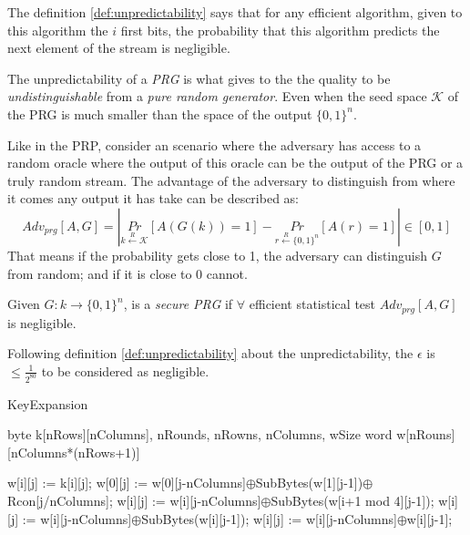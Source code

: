 \documentclass[10pt,a4paper,twoside]{llncs}
\begin{document}
The definition \ref{def:unpredictability} says that for any efficient algorithm, given to this algorithm the $i$ first bits, the probability that this algorithm predicts the next element of the stream is negligible.

The unpredictability of a \emph{PRG} is what gives to the the quality to be \emph{undistinguishable} from a \emph{pure random generator}. Even when the seed space $\mathcal{K}$ of the PRG is much smaller than the space of the output $\{0,1\}^n$.

Like in the PRP, consider an scenario where the adversary has access to a random oracle where the output of this oracle can be the output of the PRG or a truly random stream. The advantage of the adversary to distinguish from where it comes any output it has take can be described as:
\begin{equation}\label{eq:prgAdv}
 {Adv}_{prg}[A,G] = \left|
                     \underset{k\overset{R}{\leftarrow}\mathcal{K}}{Pr}\left[A(G(k))=1\right]-
                     \underset{r\overset{R}{\leftarrow}\{0,1\}^n}{Pr}\left[A(r)=1\right]
                    \right|\in [0,1]
\end{equation}
That means if the probability gets close to 1, the adversary can distinguish $G$ from random; and if it is close to 0 cannot.

\begin{definition}
 Given $G: k \rightarrow \{0,1\}^n$, is a \emph{secure PRG} if $\forall$ efficient statistical test ${Adv}_{prg}[A,G]$ is negligible.
\end{definition}

Following definition \ref{def:unpredictability} about the unpredictability, the $\epsilon$ is $\leqslant\frac{1}{2^{80}}$ to be considered as negligible.

\begin{algorithm}
 \caption{KeyExpansion}
 \label{alg:keyExpansion}
 \begin{algorithmic}[1]
  \REQUIRE byte k[nRows][nColumns], nRounds, nRowns, nColumns, wSize
  \ENSURE word w[nRouns][nColumns*(nRows+1)]

      \STATE w[i][j] := k[i][j];
    \ENDFOR
  \ENDFOR
      \STATE w[0][j] := w[0][j-nColumns]$\oplus$SubBytes(w[1][j-1])$\oplus$Rcon[j/nColumns];
        \STATE w[i][j] := w[i][j-nColumns]$\oplus$SubBytes(w[i+1 mod 4][j-1]);
      \ENDFOR
        \STATE w[i][j] := w[i][j-nColumns]$\oplus$SubBytes(w[i][j-1]);
      \ENDFOR
    \ELSE
        \STATE w[i][j] := w[i][j-nColumns]$\oplus$w[i][j-1];
      \ENDFOR
    \ENDIF
  \ENDFOR
 \end{algorithmic}
\end{algorithm}
\end{document}
